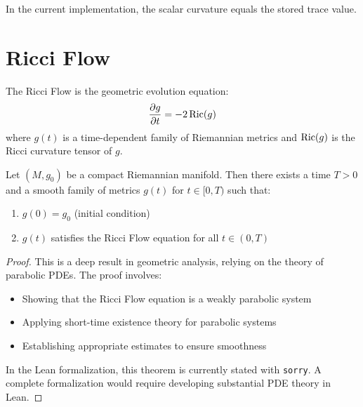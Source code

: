 \begin{lemma}
\label{lem:scalar-curvature-eq}
\leanok
{}
In the current implementation, the scalar curvature equals the stored trace value.
\end{lemma}

\chapter{Ricci Flow}
\label{chap:flow}

\begin{definition}
\label{def:ricci-flow-equation}
The Ricci Flow is the geometric evolution equation:
\[
\frac{\partial g}{\partial t} = -2 \operatorname{Ric}(g)
\]
where $g(t)$ is a time-dependent family of Riemannian metrics and $\operatorname{Ric}(g)$ is the Ricci curvature tensor of $g$.
\end{definition}

\begin{theorem}
\label{thm:short-time-existence}
Let $(M, g_0)$ be a compact Riemannian manifold. Then there exists a time $T > 0$ and a smooth family of metrics $g(t)$ for $t \in [0, T)$ such that:
\begin{enumerate}
\item $g(0) = g_0$ (initial condition)
\item $g(t)$ satisfies the Ricci Flow equation for all $t \in (0, T)$
\end{enumerate}
\end{theorem}

\begin{proof}
This is a deep result in geometric analysis, relying on the theory of parabolic PDEs. The proof involves:
\begin{itemize}
\item Showing that the Ricci Flow equation is a weakly parabolic system
\item Applying short-time existence theory for parabolic systems
\item Establishing appropriate estimates to ensure smoothness
\end{itemize}

In the Lean formalization, this theorem is currently stated with \texttt{sorry}. A complete formalization would require developing substantial PDE theory in Lean.
\end{proof}

